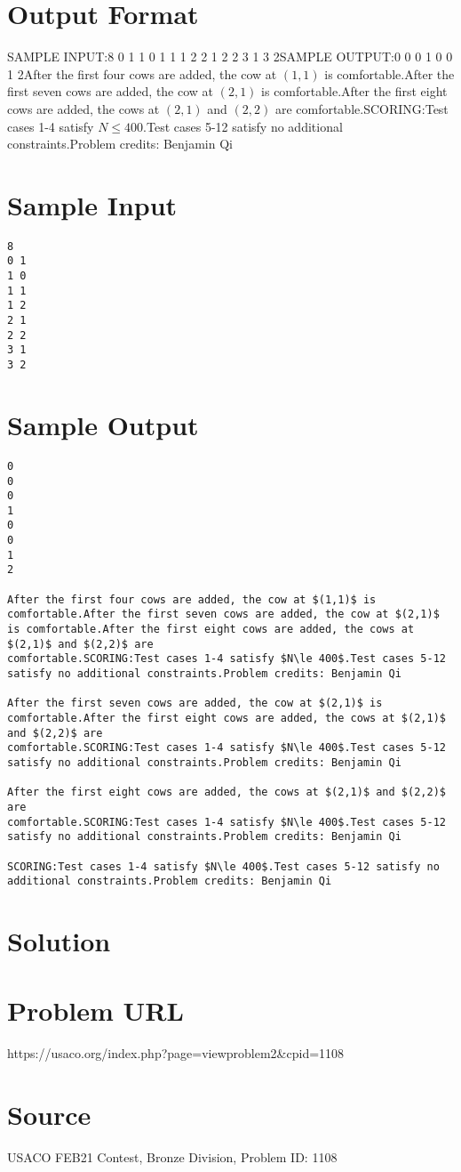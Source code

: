 \documentclass[12pt]{article}
\begin{document}
\section*{Output Format}
SAMPLE INPUT:8
0 1
1 0
1 1
1 2
2 1
2 2
3 1
3 2SAMPLE OUTPUT:0
0
0
1
0
0
1
2After the first four cows are added, the cow at $(1,1)$ is comfortable.After the first seven cows are added, the cow at $(2,1)$ is comfortable.After the first eight cows are added, the cows at $(2,1)$ and $(2,2)$ are
comfortable.SCORING:Test cases 1-4 satisfy $N\le 400$.Test cases 5-12 satisfy no additional constraints.Problem credits: Benjamin Qi

\section*{Sample Input}
\begin{verbatim}
8
0 1
1 0
1 1
1 2
2 1
2 2
3 1
3 2
\end{verbatim}

\section*{Sample Output}
\begin{verbatim}
0
0
0
1
0
0
1
2

After the first four cows are added, the cow at $(1,1)$ is comfortable.After the first seven cows are added, the cow at $(2,1)$ is comfortable.After the first eight cows are added, the cows at $(2,1)$ and $(2,2)$ are
comfortable.SCORING:Test cases 1-4 satisfy $N\le 400$.Test cases 5-12 satisfy no additional constraints.Problem credits: Benjamin Qi

After the first seven cows are added, the cow at $(2,1)$ is comfortable.After the first eight cows are added, the cows at $(2,1)$ and $(2,2)$ are
comfortable.SCORING:Test cases 1-4 satisfy $N\le 400$.Test cases 5-12 satisfy no additional constraints.Problem credits: Benjamin Qi

After the first eight cows are added, the cows at $(2,1)$ and $(2,2)$ are
comfortable.SCORING:Test cases 1-4 satisfy $N\le 400$.Test cases 5-12 satisfy no additional constraints.Problem credits: Benjamin Qi

SCORING:Test cases 1-4 satisfy $N\le 400$.Test cases 5-12 satisfy no additional constraints.Problem credits: Benjamin Qi
\end{verbatim}

\section*{Solution}


\section*{Problem URL}
https://usaco.org/index.php?page=viewproblem2&cpid=1108

\section*{Source}
USACO FEB21 Contest, Bronze Division, Problem ID: 1108
\end{document}
